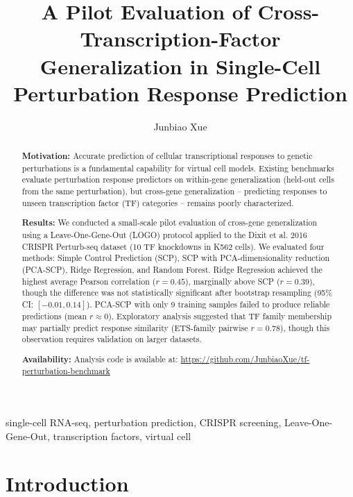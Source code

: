 \documentclass[12pt,number,sort&compress]{elsarticle}
\begin{document}
\begin{frontmatter}

\title{A Pilot Evaluation of Cross-Transcription-Factor Generalization in Single-Cell Perturbation Response Prediction}

\author{Junbiao Xue}

\begin{abstract}
\textbf{Motivation:} Accurate prediction of cellular transcriptional responses to
genetic perturbations is a fundamental capability for virtual cell models.
Existing benchmarks evaluate perturbation response predictors on
within-gene generalization (held-out cells from the same perturbation),
but cross-gene generalization -- predicting responses to unseen transcription
factor (TF) categories -- remains poorly characterized.

\textbf{Results:} We conducted a small-scale pilot evaluation of cross-gene
generalization using a Leave-One-Gene-Out (LOGO) protocol applied to the
Dixit et al. 2016 CRISPR Perturb-seq dataset (10 TF knockdowns in K562 cells).
We evaluated four methods: Simple Control Prediction (SCP), SCP with
PCA-dimensionality reduction (PCA-SCP), Ridge Regression, and Random Forest.
Ridge Regression achieved the highest average Pearson correlation ($r = 0.45$),
marginally above SCP ($r = 0.39$), though the difference was not statistically
significant after bootstrap resampling (95\% CI: $[-0.01, 0.14]$).
PCA-SCP with only 9 training samples failed to produce reliable predictions
(mean $r \approx 0$). Exploratory analysis suggested that TF family membership
may partially predict response similarity (ETS-family pairwise $r = 0.78$),
though this observation requires validation on larger datasets.

\textbf{Availability:} Analysis code is available at:
\url{https://github.com/JunbiaoXue/tf-perturbation-benchmark}
\end{abstract}

\begin{keyword}
single-cell RNA-seq, perturbation prediction, CRISPR screening,
Leave-One-Gene-Out, transcription factors, virtual cell
\end{keyword}

\end{frontmatter}

\section{Introduction}
\label{sec:intro}
\end{document}
